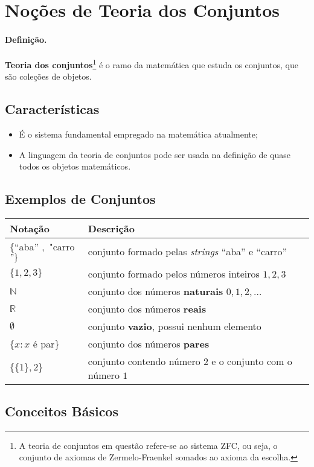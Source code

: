 \section{Noções de Teoria dos Conjuntos}

\paragraph{Definição.} 
\textbf{Teoria dos conjuntos}\footnote{A teoria de 
conjuntos em questão refere-se
ao sistema ZFC, ou seja, o conjunto 
de axiomas de Zermelo-Fraenkel
somados ao axioma da escolha.}
é o ramo da matemática que estuda os conjuntos, 
que são coleções de objetos.

\hypertarget{caracteruxedsticas}{%
\subsection{Características}\label{caracteruxedsticas}}

\begin{itemize}
\item
  É o sistema fundamental empregado na matemática
  atualmente;
\item
  A linguagem da teoria de conjuntos pode ser usada na definição de
  quase todos os objetos matemáticos.
\end{itemize}

\subsection{Exemplos de Conjuntos}

\begin{longtable}[]{@{}ll@{}}\hline
\hfil Notação & \hfil Descrição\\\hline
\(\{\)``aba'' \(,\) "carro\("\}\) & conjunto formado pelas
\emph{strings} ``aba'' e ``carro''\tabularnewline
\(\{1,2,3\}\) & conjunto formado pelos números inteiros
\(1, 2, 3\)\tabularnewline
	\(\mathbb{N}\) & conjunto dos números \textbf{naturais}
\(0,1,2,\dots\)\tabularnewline
	\(\mathbb{R}\) & conjunto dos números \textbf{reais}\tabularnewline
\(\emptyset\) & conjunto \textbf{vazio}, possui nenhum
elemento\tabularnewline
\(\{x:x\) é par\(\}\) & conjunto dos números
\textbf{pares}\tabularnewline
\(\{\{1\},2\}\) & conjunto contendo número \(2\) e o conjunto com o
número \(1\)\\\hline
\end{longtable}

\subsection{Conceitos Básicos}

